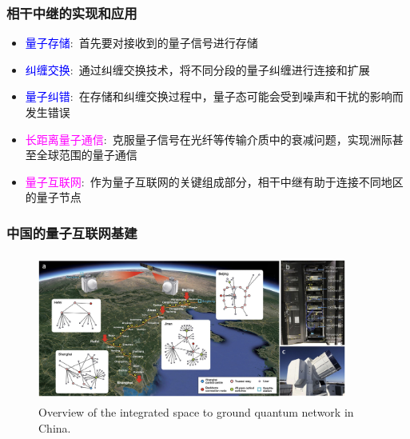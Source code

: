 \begin{frame}
    \frametitle{相干中继的实现和应用}
    \begin{itemize}
	    \item \textcolor{blue}{量子存储}:~首先要对接收到的量子信号进行存储\\
		    {\fontsize{7.5pt}{5.2pt}\selectfont{利用量子存储器将量子态暂时保存下来，避免信号在传输过程中因损耗而丢失}}
	    \item \textcolor{blue}{纠缠交换}:~通过纠缠交换技术，将不同分段的量子纠缠进行连接和扩展\\
		    {\fontsize{7.5pt}{5.2pt}\selectfont{例如，将相邻两个中继节点之间的纠缠态延伸到更远的距离，使得量子信息能够跨越更长的距离进行传输}}
	    \item \textcolor{blue}{量子纠错}:~在存储和纠缠交换过程中，量子态可能会受到噪声和干扰的影响而发生错误\\
		    {\fontsize{7.5pt}{5.2pt}\selectfont{利用量子纠错编码对错误进行检测和纠正，确保量子态的准确性和相干性}}
    \end{itemize}
    \begin{itemize}
	    \item \textcolor{magenta}{长距离量子通信}:~克服量子信号在光纤等传输介质中的衰减问题，实现洲际甚至全球范围的量子通信\\
		{\fontsize{7.5pt}{5.2pt}\selectfont{为构建全球化的量子通信网络提供可能}}
	\item \textcolor{magenta}{量子互联网}:~作为量子互联网的关键组成部分，相干中继有助于连接不同地区的量子节点\\
		{\fontsize{7.5pt}{5.2pt}\selectfont{实现量子信息在网络中的高效传输和共享，推动量子互联网的发展}}
    \end{itemize}
\end{frame}

\begin{frame}
    \frametitle{中国的量子互联网基建}
    \begin{figure}
        \centering
                \includegraphics[height=1.9in, width=4.0in, viewport=0 0 525 230,clip]{Figures/Overview-of-the-integrated-space-to-ground-quantum_network-in-China.jpg}
		\caption{\tiny{\textrm{Overview of the integrated space to ground quantum network in China.}}}
		\label{Fig:Overview-of-the integrated-space-to-ground-quantum_network-in-China}
    \end{figure}
\end{frame}


